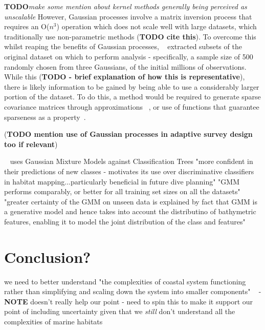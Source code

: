 \documentclass[12pt]{article}
\begin{document}
            \textbf{TODO}\textit{make some mention about kernel methods generally being perceived as unscalable}
            However, Gaussian processes involve a matrix inversion process that requires an O($n^3$) operation which does not scale well with large datasets, which traditionally use non-parametric methods (\textbf{TODO cite this}). To overcome this whilst reaping the benefits of Gaussian processes, ~\citet*{bender12} extracted subsets of the original dataset on which to perform analysis - specifically, a sample size of 500 randomly chosen from three Gaussians, of the initial millions of observations. While this (\textbf{TODO - brief explanation of how this is representative}), there is likely information to be gained by being able to use a considerably larger portion of the dataset. To do this, a method would be required to generate sparse covariance matrices through approximations ~\citep*{bickel08}, or use of functions that guarantee sparseness as a property~\citep*{melkumyan09}.

            (\textbf{TODO mention use of Gaussian processes in adaptive survey design too if relevant})

            ~\cite{ahsan11} uses Gaussian Mixture Models against Classification Trees
            "more confident in their predictions of new classes - motivates its use over discriminative classifiers in habitat mapping...particularly beneficial in future dive planning"
            "GMM performs comparably, or better for all training set sizes on all the datasets"
            "greater certainty of the GMM on unseen data is explained by fact that GMM is a generative model and hence takes into account the distributino of bathymetric features, enabling it to model the joint distribution of the class and features"

            \section{Conclusion?}
            we need to better understand "the complexities of coastal system functioning rather than simplifying and scaling down the system into smaller components" ~\citep*{diaz04} - \textbf{NOTE} doesn't really help our point - need to spin this to make it support our point of including uncertainty given that we \textit{still} don't understand all the complexities of marine habitats

\newpage




\end{document}
